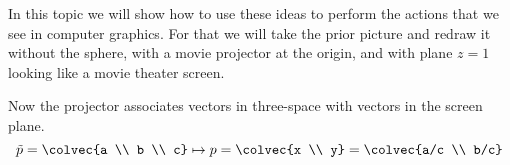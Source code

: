 In this topic we will show how to use these ideas to perform the actions that 
we see in computer graphics.
For that we will take the prior picture and redraw it without the sphere,
with a movie projector at the origin, and with plane $z=1$ looking like
a movie theater screen.
\begin{center} 
\end{center}
Now the projector associates vectors in three-space with
vectors in the screen plane.
\begin{equation*}
  \tilde{p}=\colvec{a \\ b \\ c} 
  \mapsto 
  p=\colvec{x \\ y}=\colvec{a/c \\ b/c}
\end{equation*}


